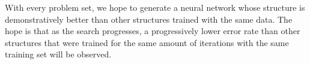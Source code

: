 With every problem set, we hope to generate a neural network whose structure is demonstratively better than other structures trained with the same data.
The hope is that as the search progresses, a progressively lower error rate than other structures that were trained for the same amount of iterations with the same training set will be observed.
